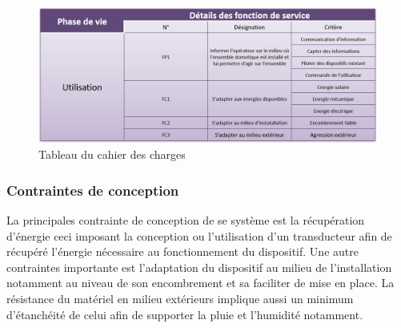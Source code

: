 \documentclass{rapportENS}
\begin{document}
     \begin{figure}[h!]
         \centering
            \includegraphics[width=\linewidth]{tableau_cdcf.png}
     \caption{Tableau du cahier des charges}
     \label{tableau_cdcf}
 \end{figure}
\subsubsection{Contraintes de conception}
La principales contrainte de conception de se système est la récupération d'énergie ceci imposant la conception ou l'utilisation d'un transducteur afin de récupéré l'énergie nécessaire au fonctionnement du dispositif. Une autre contraintes importante est l'adaptation du dispositif au milieu de l'installation notamment au niveau de son encombrement et sa faciliter de mise en place.   La résistance du matériel en milieu extérieurs implique aussi un minimum d'étanchéité de celui afin de supporter la pluie et l'humidité notamment.
\end{document}
